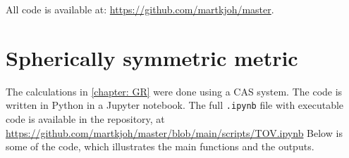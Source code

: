 \label{appendix: code} 
 
All code is available at: \url{https://github.com/martkjoh/master}.

\section{Spherically symmetric metric}
The calculations in \autoref{chapter: GR} were done using a CAS system.
The code is written in Python in a Jupyter notebook.
The full \texttt{.ipynb} file with executable code is available in the repository, at \url{https://github.com/martkjoh/master/blob/main/scripts/TOV.ipynb}
Below is some of the code, which illustrates the main functions and the outputs.



